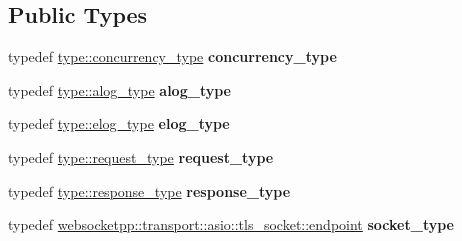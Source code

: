\subsection*{Public Types}
\begin{DoxyCompactItemize}
\item 
typedef \hyperlink{classwebsocketpp_1_1concurrency_1_1basic}{type\+::concurrency\+\_\+type} {\bfseries concurrency\+\_\+type}\hypertarget{structwebsocketpp_1_1config_1_1asio__tls_1_1transport__config_a61a02e8169d3374664360484aa4addb5}{}\label{structwebsocketpp_1_1config_1_1asio__tls_1_1transport__config_a61a02e8169d3374664360484aa4addb5}

\item 
typedef \hyperlink{classwebsocketpp_1_1log_1_1basic}{type\+::alog\+\_\+type} {\bfseries alog\+\_\+type}\hypertarget{structwebsocketpp_1_1config_1_1asio__tls_1_1transport__config_a2ea303b3ffc0ef7eabc7f81f0be96e4f}{}\label{structwebsocketpp_1_1config_1_1asio__tls_1_1transport__config_a2ea303b3ffc0ef7eabc7f81f0be96e4f}

\item 
typedef \hyperlink{classwebsocketpp_1_1log_1_1basic}{type\+::elog\+\_\+type} {\bfseries elog\+\_\+type}\hypertarget{structwebsocketpp_1_1config_1_1asio__tls_1_1transport__config_aa5911130efb47b5ce5e75221d1533156}{}\label{structwebsocketpp_1_1config_1_1asio__tls_1_1transport__config_aa5911130efb47b5ce5e75221d1533156}

\item 
typedef \hyperlink{classwebsocketpp_1_1http_1_1parser_1_1request}{type\+::request\+\_\+type} {\bfseries request\+\_\+type}\hypertarget{structwebsocketpp_1_1config_1_1asio__tls_1_1transport__config_ae6034f4e1eb1949147e19d148342eec7}{}\label{structwebsocketpp_1_1config_1_1asio__tls_1_1transport__config_ae6034f4e1eb1949147e19d148342eec7}

\item 
typedef \hyperlink{classwebsocketpp_1_1http_1_1parser_1_1response}{type\+::response\+\_\+type} {\bfseries response\+\_\+type}\hypertarget{structwebsocketpp_1_1config_1_1asio__tls_1_1transport__config_a1522be0695a14d9bc31fa6ccdaaf9d4c}{}\label{structwebsocketpp_1_1config_1_1asio__tls_1_1transport__config_a1522be0695a14d9bc31fa6ccdaaf9d4c}

\item 
typedef \hyperlink{classwebsocketpp_1_1transport_1_1asio_1_1tls__socket_1_1endpoint}{websocketpp\+::transport\+::asio\+::tls\+\_\+socket\+::endpoint} {\bfseries socket\+\_\+type}\hypertarget{structwebsocketpp_1_1config_1_1asio__tls_1_1transport__config_a0c1767ea0f1c1f9cc58b3c4827549b1d}{}\label{structwebsocketpp_1_1config_1_1asio__tls_1_1transport__config_a0c1767ea0f1c1f9cc58b3c4827549b1d}

\end{DoxyCompactItemize}
